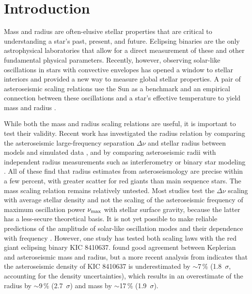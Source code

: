 
\section{Introduction}\label{intro}


Mass and radius are often-elusive stellar properties that are critical to understanding a star's past, present, and future. Eclipsing binaries are the only astrophysical laboratories that allow for a direct measurement of these and other fundamental physical parameters. Recently, however, observing solar-like oscillations in stars with convective envelopes has opened a window to stellar interiors and provided a new way to measure global stellar properties. A pair of asteroseismic scaling relations use the Sun as a benchmark and an empirical connection between these oscillations and a star's effective temperature to yield mass and radius \citep{kje95,hub10,mos13}.

While both the mass and radius scaling relations are useful, it is important to test their validity. Recent work has investigated the radius relation by comparing the asteroseismic large-frequency separation $\Delta \nu$ and stellar radius between models and simulated data \citep[e.g.][]{ste09,whi11,mig13}, and by comparing asteroseismic radii with independent radius measurements such as interferometry or binary star modeling \citep[e.g.][]{hub11,hub12,sil12}. All of these find that radius estimates from asteroseismology are precise within a few percent, with greater scatter for red giants than main sequence stars. The mass scaling relation remains relatively untested. Most studies test the $\Delta\nu$ scaling with average stellar density and not the scaling of the asteroseismic frequency of maximum oscillation power $\nu_{\rm{max}}$ with stellar surface gravity, because the latter has a less-secure theoretical basis. It is not yet possible to make reliable predictions of the amplitude of solar-like oscillation modes and their dependence with frequency \citep{chr12}. However, one study has tested both scaling laws with the red giant eclipsing binary KIC 8410637. \citet{fra13} found good agreement between Keplerian and asteroseismic mass and radius, but a more recent analysis from \citet{hub14} indicates that the asteroseismic density of KIC 8410637 is underestimated by $\sim$7\,\% (1.8~$\sigma$, accounting for the density uncertainties), which results in an overestimate of the radius by $\sim$9\,\% (2.7~$\sigma$) and mass by $\sim$17\,\% (1.9~$\sigma$).

